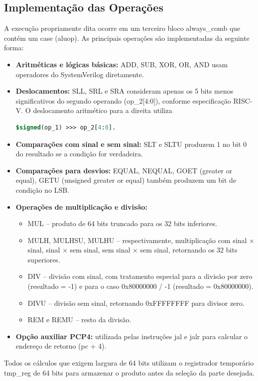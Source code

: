 \documentclass[
	12pt,				%
	oneside,
	a4paper,			%
	english,			%
	french,				%
	spanish,			%
	brazil,				%
	]{abntex2}
\begin{document}
\subsection{Implementação das Operações}
A execução propriamente dita ocorre em um terceiro bloco always\_comb que contém um case (aluop). As principais operações são implementadas da seguinte forma:
\begin{itemize}
    \item \textbf{Aritméticas e lógicas básicas:} ADD, SUB, XOR, OR, AND usam operadores do SystemVerilog diretamente.
    \item \textbf{Deslocamentos:} SLL, SRL e SRA consideram apenas os 5 bits menos significativos do segundo operando (op\_2[4:0]), conforme especificação RISC-V. O deslocamento aritmético para a direita utiliza 
    \begin{lstlisting}[language=SystemVerilog]
    $signed(op_1) >>> op_2[4:0].
    \end{lstlisting}
    \item \textbf{Comparações com sinal e sem sinal:} SLT e SLTU produzem 1 no bit 0 do resultado se a condição for verdadeira.
    \item \textbf{Comparações para desvios:} EQUAL, NEQUAL, GOET (greater or equal), GETU (unsigned greater or equal) também produzem um bit de condição no LSB.
    \item \textbf{Operações de multiplicação e divisão:}
    \begin{itemize}
        \item MUL – produto de 64 bits truncado para os 32 bits inferiores.
        \item MULH, MULHSU, MULHU – respectivamente, multiplicação com sinal × sinal, sinal × sem sinal, sem sinal × sem sinal, retornando os 32 bits superiores.
        \item DIV – divisão com sinal, com tratamento especial para a divisão por zero (resultado = -1) e para o caso 0x80000000 / -1 (resultado = 0x80000000).
        \item DIVU – divisão sem sinal, retornando 0xFFFFFFFF para divisor zero.
        \item REM e REMU – resto da divisão.
    \end{itemize}
    \item \textbf{Opção auxiliar PCP4:} utilizada pelas instruções jal e jalr para calcular o endereço de retorno (pc + 4).
\end{itemize}

Todos os cálculos que exigem largura de 64 bits utilizam o registrador temporário tmp\_reg de 64 bits para armazenar o produto antes da seleção da parte desejada.
\end{document}
